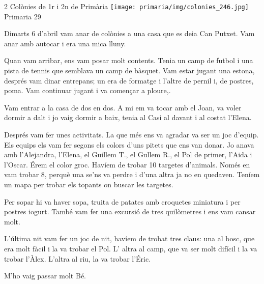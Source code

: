 \begin{news}
{2} %
{Colònies de 1r i 2n de Primària}
{\noindent\texttt{[image: primaria/img/colonies\_246.jpg]}}
{Primaria}
{29} %

Dimarts 6 d’abril vam anar de colònies a una casa que es deia Can Putxet. Vam anar amb autocar  i era una mica lluny.

Quan vam arribar,  ens vam posar molt contents. Tenia un camp de futbol i una pista de tennis que semblava un camp de bàsquet. Vam estar jugant una estona, després vam dinar entrepans; un era de formatge i l’altre de pernil i, de postres, poma. Vam continuar jugant i va començar a ploure,. 

Vam entrar a la casa de dos en dos. A mi em va tocar amb el Joan, va voler dormir a dalt i jo vaig dormir a baix, tenia al Casi al davant i al costat l’Elena.


Després vam fer unes activitats. La que més ens va agradar  va ser un joc d’equip. Els equips els vam fer segons els colors d’uns pitets  que ens van donar. Jo anava amb l’Alejandra, l’Elena, el Guillem T., el Gullem R., el Pol de primer, l’Aida i l’Oscar. Érem el color groc. Havíem de trobar 10 targetes d’animals. Només en vam trobar 8, perquè una se’ns va perdre i d’una altra ja  no en quedaven. Teníem un mapa per trobar els topants on buscar les targetes.

Per sopar hi  va haver sopa, truita de patates amb croquetes miniatura i per  postres iogurt. També vam fer una excursió de tres quilòmetres i ens vam cansar molt.

L’última nit vam fer un joc de nit, havíem de trobat tres claus: una al bosc, que era molt fàcil i la va trobar el Pol. L’ altra al camp, que va ser molt difícil i la va trobar l’Àlex. L’altra al riu, la va trobar l’Éric.

M’ho vaig passar molt Bé.


\end{news}

